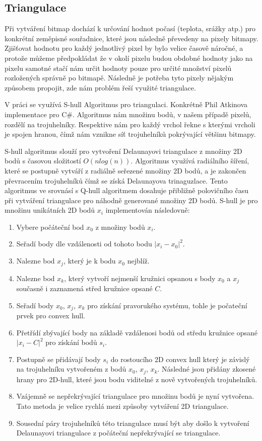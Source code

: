 \documentclass[czech,bachelor,dept460,male,csharp,cpdeclaration]{diploma}
\begin{document}
	\subsection{Triangulace}
	
	Při vytváření bitmap dochází k určování hodnot počasí (teplota, srážky atp.) pro konkrétní zeměpisné souřadnice, které jsou následně převedeny na pixely bitmapy. Zjišťovat hodnotu pro každý jednotlivý pixel by bylo velice časově náročné, a protože můžeme předpokládat že v okolí pixelu budou obdobné hodnoty jako na pixelu samotné stačí nám určit hodnoty pouze pro určité množství pixelů rozložených správně po bitmapě. Následně je potřeba tyto pixely nějakým způsobem propojit, zde nám problém řeší využité triangulace.
	
	V práci se využívá S-hull Algoritmus pro triangulaci. Konkrétně Phil Atkinova implementace pro C\#. Algoritmus nám množinu bodů, v našem případě pixelů, rozdělí na trojuhelníky. Respektive nám pro každý vrchol řekne s kterými vrcholi je spojen hranou, čímž nám vznikne síť trojuhelníků pokrývající většinu bitmapy.
	
	
	S-hull algoritmus slouží pro vytvoření Delaunayovi triangulace z množiny 2D bodů s časovou složitostí $O(n  log(n))$. Algoritmus využívá radiálního šíření, které se postupně vytváří z radiálně seřezené množiny 2D bodů, a je zakončen převracením trojuhelníků čímž se získá Delaunayova trinaguzlace. Tento algoritmus ve srovnásí s Q-hull algoritmem dosahuje přibližně polovičního času při vytváření triangulace pro náhodně generované množiny 2D bodů. S-hull je pro množinu unikátních 2D bodů $x_i$ implementován následovně:
	\begin{enumerate}
		\item Vybere počáteční bod $x_0$ z množiny bodů $x_i$.
		\item Seřadí body dle vzdálenosti od tohoto bodu $|x_i - x_0|^2$.
		\item Nalezne bod $x_j$, který je k bodu $x_0$ nejblíž.
		\item Nalezne bod $x_k$, který vytvoří nejmenší kružnici opsanou s body $x_0$ a $x_j$ současně i zaznamená střed kružnice opsané $C$.
		\item Seřadí body $x_0$, $x_j$, $x_k$ pro získání pravorukého systému, tohle je počateční prvek pro convex hull.
		\item Přetřídí zbývající body na základě vzdálenosi bodů od středu kružnice opsané $|x_i - C|^2$ pro získání bodů $s_i$.
		\item Postupně se přidávají body $s_i$ do rostoucího 2D convex hull který je závislý na trojuhelníku vytvořeném z bodů $x_0$, $x_j$, $x_k$. Následné jsou přidány zkosené hrany pro 2D-hull, které jsou bodu viditelné z nově vytvořených trojuhelníků.
		\item Vzájemně se nepřekrývající triangulace pro množinu bodů je nyní vytvořena. Tato metoda je velice rychlá mezi způsoby vytváření 2D triangulace.
		\item Sousední páry trojuhelníků této triangulace musí být  aby došlo k vytvoření Delaunayovi triangulace z počáteční nepřekrývající se triangulace.
	\end{enumerate}
	
\end{document}
